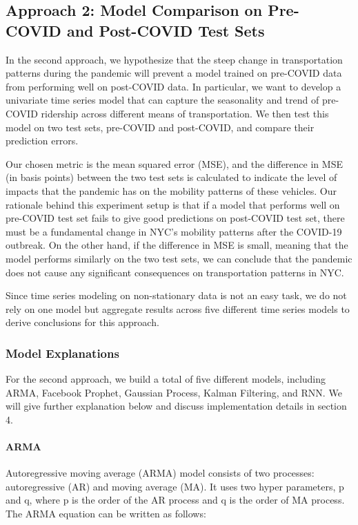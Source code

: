 \documentclass{article}
\begin{document}
\subsection{Approach 2: Model Comparison on Pre-COVID and Post-COVID Test Sets}

In the second approach, we hypothesize that the steep change in transportation patterns during the pandemic will prevent a model trained on pre-COVID data from performing well on post-COVID data. In particular, we want to develop a univariate time series model that can capture the seasonality and trend of pre-COVID ridership across different means of transportation. We then test this model on two test sets, pre-COVID and post-COVID, and compare their prediction errors. 

Our chosen metric is the mean squared error (MSE), and the difference in MSE (in basis points) between the two test sets is calculated to indicate the level of impacts that the pandemic has on the mobility patterns of these vehicles. Our rationale behind this experiment setup is that if a model that performs well on pre-COVID test set fails to give good predictions on post-COVID test set, there must be a fundamental change in NYC’s mobility patterns after the COVID-19 outbreak. On the other hand, if the difference in MSE is small, meaning that the model performs similarly on the two test sets, we can conclude that the pandemic does not cause any significant consequences on transportation patterns in NYC. 

Since time series modeling on non-stationary data is not an easy task, we do not rely on one model but aggregate results across five different time series models to derive conclusions for this approach. 

\subsubsection{Model Explanations}

For the second approach, we build a total of five different models, including ARMA, Facebook Prophet, Gaussian Process, Kalman Filtering, and RNN. We will give further explanation below and discuss implementation details in section 4.

\paragraph{ARMA} 
Autoregressive moving average (ARMA) model consists of two processes: autoregressive (AR) and moving average (MA). It uses two hyper parameters, p and q, where p is the order of the AR process and q is the order of MA process. The ARMA equation can be written as follows:
\end{document}
